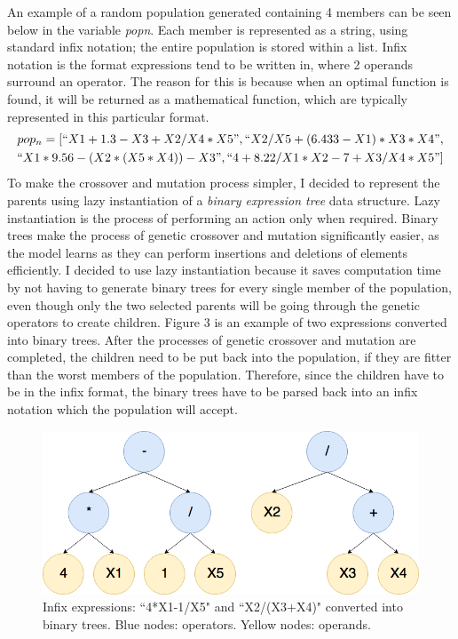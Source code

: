 \documentclass[11pt]{article}
\begin{document}
An example of a random population generated containing 4 members can be seen below in the variable \textit{pop\textunderscore n}. Each member is represented as a string, using standard infix notation; the entire population is stored within a list. Infix notation is the format expressions tend to be written in, where 2 operands surround an operator. The reason for this is because when an optimal function is found, it will be returned as a mathematical function, which are typically represented in this particular format. 
\begin{align*}
pop_n = [``X1+1.3-X3+X2/X4*X5" ,``X2/X5+(6.433-X1)*X3*X4", \\
``X1*9.56-(X2*(X5*X4))-X3", ``4+8.22/X1*X2-7+X3/X4*X5"] 
\end{align*}
To make the crossover and mutation process simpler, I decided to represent the parents using lazy instantiation of a \textit{binary expression tree} data structure. Lazy instantiation is the process of performing an action only when required. Binary trees make the process of genetic crossover and mutation significantly easier, as the model learns as they can perform insertions and deletions of elements efficiently. I decided to use lazy instantiation because it saves computation time by not having to generate binary trees for every single member of the population, even though only the two selected parents will be going through the genetic operators to create children. Figure 3 is an example of two expressions converted into binary trees. After the processes of genetic crossover and mutation are completed, the children need to be put back into the population, if they are fitter than the worst members of the population. Therefore, since the children have to be in the infix format, the binary trees have to be parsed back into an infix notation which the population will accept. 
\begin{figure}[h]
\centering
\includegraphics[scale = .40]{binaryT}
\caption{Infix expressions: ``4*X1-1/X5" and ``X2/(X3+X4)" converted into binary trees. Blue nodes: operators. Yellow nodes: operands. } 
\end{figure}
\end{document}
